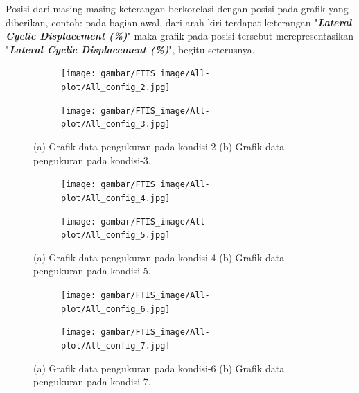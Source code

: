 Posisi dari masing-masing keterangan berkorelasi dengan posisi pada grafik yang diberikan, contoh: pada bagian awal, dari arah kiri terdapat keterangan "\textbf{\textit{Lateral Cyclic Displacement (\%)}}" maka grafik pada posisi tersebut merepresentasikan "\textbf{\textit{Lateral Cyclic Displacement (\%)}}", begitu seterusnya.

\begin{figure}[H]
	\centering
	\begin{subfigure}{0.49\textwidth}
		\centering
		\texttt{[image: gambar/FTIS\_image/All-plot/All\_config\_2.jpg]}
		\caption{}
		\label{fig:condition_2}
	\end{subfigure}
	\centering
	\begin{subfigure}{0.49\textwidth}
		\centering
		\texttt{[image: gambar/FTIS\_image/All-plot/All\_config\_3.jpg]}
		\caption{}
		\label{fig:condition_3}
	\end{subfigure}
	\caption{(a) Grafik data pengukuran pada kondisi-2 (b) Grafik data pengukuran pada kondisi-3.}
\end{figure}

\begin{figure}[H]
	\begin{subfigure}{0.49\textwidth}
		\centering
		\texttt{[image: gambar/FTIS\_image/All-plot/All\_config\_4.jpg]}
		\caption{}
		\label{fig:condition_4}
	\end{subfigure}
	\centering
	\begin{subfigure}{0.49\textwidth}
		\centering
		\texttt{[image: gambar/FTIS\_image/All-plot/All\_config\_5.jpg]}
		\caption{}
		\label{fig:condition_5}
	\end{subfigure}
	\caption{(a) Grafik data pengukuran pada kondisi-4 (b) Grafik data pengukuran pada kondisi-5.}
\end{figure}

\begin{figure}[H]
	\begin{subfigure}{0.49\textwidth}
		\centering
		\texttt{[image: gambar/FTIS\_image/All-plot/All\_config\_6.jpg]}
		\caption{}
		\label{fig:condition_6}
	\end{subfigure}
	\centering
	\begin{subfigure}{0.49\textwidth}
		\centering
		\texttt{[image: gambar/FTIS\_image/All-plot/All\_config\_7.jpg]}
		\caption{}
		\label{fig:condition_7}
	\end{subfigure}
	\caption{(a) Grafik data pengukuran pada kondisi-6 (b) Grafik data pengukuran pada kondisi-7.}
\end{figure}

